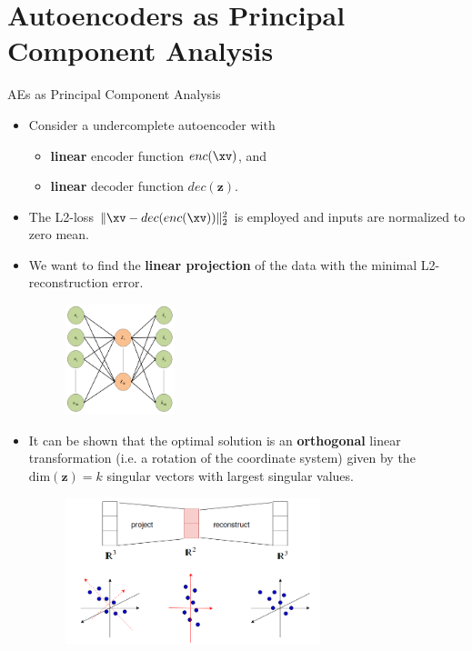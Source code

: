 \section{Autoencoders as Principal Component Analysis}

\begin{vbframe}{AEs as Principal Component Analysis}

  \begin{itemize}
    \item Consider a undercomplete autoencoder with
    \begin{itemize}
      \item \textbf{linear} encoder function $enc(\xv)$, and
      \item \textbf{linear} decoder function $dec(\pmb{z})$.
    \end{itemize}  
    \item The L2-loss $\|\xv-dec(enc(\xv))\|^2_2$ is employed and inputs are normalized to zero mean.   
    \item %
    We want to find the \textbf{linear projection} of the data with the minimal L2-reconstruction error.

    \begin{figure}
      \centering
      \includegraphics[width=0.3\textwidth]{plots/autoencoder_mnist_example.png}
    \end{figure}

    \framebreak 

    \item It can be shown that %
    the optimal solution is an \textbf{orthogonal} linear transformation (i.e. a rotation of the coordinate system) given by the $\text{dim}(\bm{z}) = k$ singular vectors with largest singular values. 

    \begin{figure}
    \centering
    \includegraphics[width=0.7\textwidth]{plots/PCA_AE.png}
    \end{figure}


\end{itemize}
\end{vbframe}
